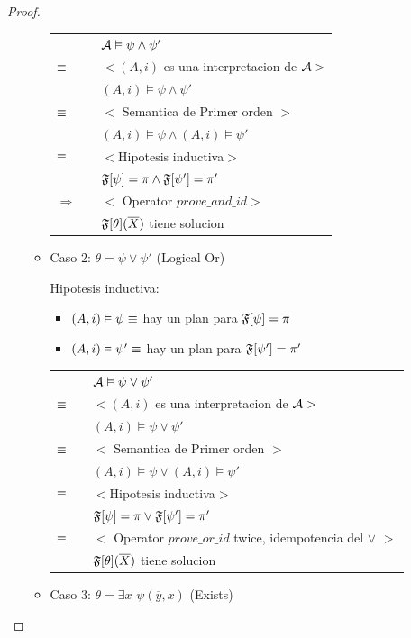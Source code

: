 \begin{proof}
\begin{itemize}
\begin{itemize}
					\begin{tabular}{@{}p{1mm}p{1mm}p{11cm}}	
					 	& & $\mathcal{A} \vDash \psi \land \psi'$\\
						$\equiv$ & & $<(A,i)$ es una interpretacion de $\mathcal{A}>$ \\
						& & $(A,i) \models \psi \land \psi'$ \\
						$\equiv$ & & $<$ Semantica de Primer orden $>$\\
						& & $(A,i) \models \psi \land (A,i) \models \psi'$ \\
						$\equiv$ & & $<$Hipotesis inductiva$>$\\
						& & $\mathfrak{F}[\psi] = \pi \land \mathfrak{F}[\psi'] = \pi'$\\
						$\Rightarrow$ & & $<$ Operator $ prove\_and\_id >$\\
						& & $\mathfrak{F}[\theta](\overline{X})$ tiene solucion
					\end{tabular}
				\item Caso 2: $\theta = \psi \lor \psi'$ (Logical Or)
					  
					  Hipotesis inductiva:
					 	\begin{itemize}
					 		\item $(A,i) \vDash \psi \equiv$ hay un plan para $\mathfrak{F}[\psi] = \pi$
							\item $(A,i) \vDash \psi' \equiv$ hay un plan para $\mathfrak{F}[\psi'] = \pi'$
					 	\end{itemize}
				
					\begin{tabular}{@{}p{1mm}p{1mm}p{11cm}}	
					 	& & $\mathcal{A} \vDash \psi \lor \psi'$\\
						$\equiv$ & & $<(A,i)$ es una interpretacion de $\mathcal{A}>$ \\
						& & $(A,i) \models \psi \lor \psi'$ \\
						$\equiv$ & & $<$ Semantica de Primer orden $>$\\
						& & $(A,i) \models \psi \lor (A,i) \models \psi'$ \\
						$\equiv$ & & $<$Hipotesis inductiva$>$\\
						& & $\mathfrak{F}[\psi] = \pi \lor \mathfrak{F}[\psi'] = \pi'$\\
						$\equiv$ & & $<$ Operator $ prove\_or\_id$ twice, idempotencia del $\lor$ $>$\\
						& & $\mathfrak{F}[\theta](\overline{X})$ tiene solucion
					\end{tabular}
					
				\item Caso 3: $\theta = \exists x$ $ \psi(\overline{y},x)$ (Exists)
					  

\end{itemize}
\end{itemize}
\end{proof}
